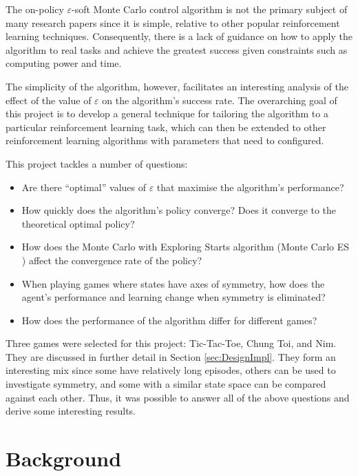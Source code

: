 \documentclass[11pt,a4paper]{report}
\begin{document}
The on-policy $\varepsilon$-soft Monte Carlo control algorithm is not the primary subject of many research papers since it is simple, relative to other popular reinforcement learning techniques. Consequently, there is a lack of guidance on how to apply the algorithm to real tasks and achieve the greatest success given constraints such as computing power and time.

The simplicity of the algorithm, however, facilitates an interesting analysis of the effect of the value of $\varepsilon$ on the algorithm's success rate. The overarching goal of this project is to develop a general technique for tailoring the algorithm to a particular reinforcement learning task, which can then be extended to other reinforcement learning algorithms with parameters that need to configured.

This project tackles a number of questions:

\begin{itemize}
	\item Are there ``optimal'' values of $\varepsilon$ that maximise the algorithm's performance?
	\item How quickly does the algorithm's policy converge? Does it converge to the theoretical optimal policy?
    \item How does the Monte Carlo with Exploring Starts algorithm (Monte Carlo ES \cite{rl-book}) affect the convergence rate of the policy?
	\item When playing games where states have axes of symmetry, how does the agent's 
performance and learning change when symmetry is eliminated?
	\item How does the performance of the algorithm differ for different games?
\end{itemize}

Three games were selected for this project: Tic-Tac-Toe, Chung Toi, and Nim. They are discussed in further detail in Section \ref{sec:DesignImpl}. They form an interesting mix since some have relatively long episodes, others can be used to investigate symmetry, and some with a similar state space can be compared against each other. Thus, it was possible to answer all of the above questions and derive some interesting results.



\chapter{Background}
\end{document}
